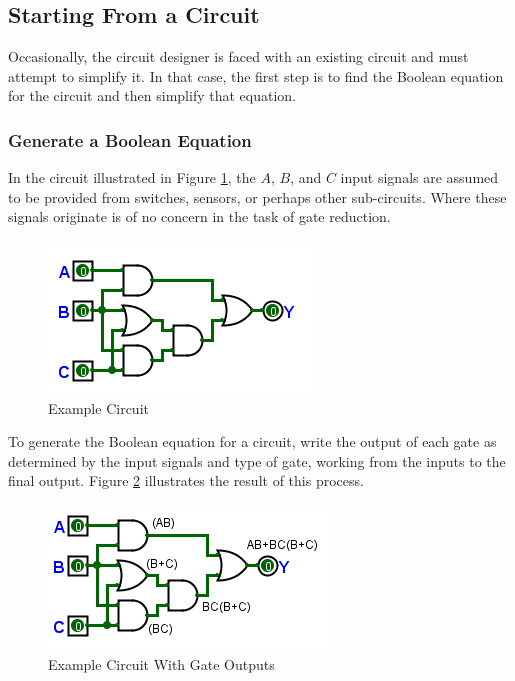 \subsection{Starting From a Circuit}
\label{05:subsec:starting_from_a_circuit}

Occasionally, the circuit designer is faced with an existing circuit and must attempt to simplify it. In that case, the first step is to find the Boolean equation for the circuit and then simplify that equation. 

\subsubsection{Generate a Boolean Equation}
\label{05:subsubsec:generate_a_boolean_equation}

In the circuit illustrated in Figure \ref{fig:05_04}, the  $ A $,  $ B $, and  $ C $ input signals are assumed to be provided from switches, sensors, or perhaps other sub-circuits. Where these signals originate is of no concern in the task of gate reduction.

\begin{figure}[H]
	\centering
	\includegraphics[width=\maxwidth{.95\linewidth}]{gfx/05_04}
	\caption{Example Circuit}
	\label{fig:05_04}
\end{figure}

To generate the Boolean equation for a circuit, write the output of each gate as determined by the input signals and type of gate, working from the inputs to the final output. Figure \ref{fig:05_05} illustrates the result of this process.

\begin{figure}[H]
	\centering
	\includegraphics[width=\maxwidth{.95\linewidth}]{gfx/05_05}
	\caption{Example Circuit With Gate Outputs}
	\label{fig:05_05}
\end{figure}

